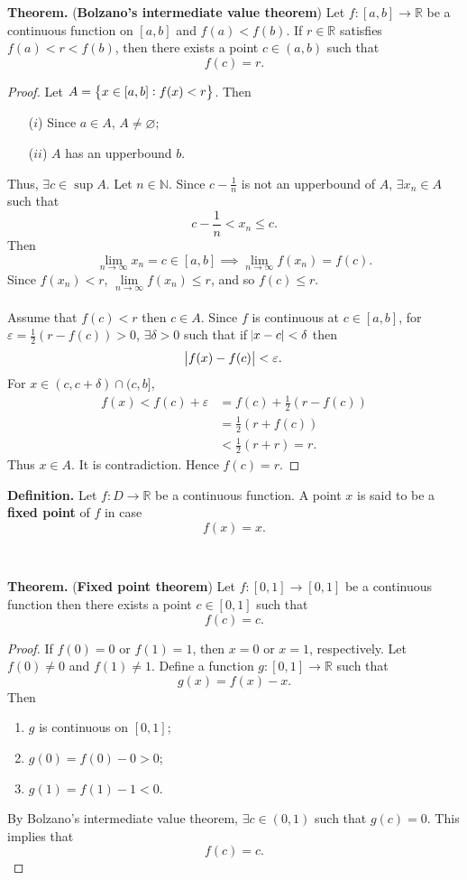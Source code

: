\documentclass[12pt,a4paper]{article}
\newcommand{\dispsty}{\displaystyle}
\begin{document}
\begin{tcolorbox}[colback=white]
	\textbf{Theorem.} (\textbf{Bolzano's intermediate value theorem}) Let $f:[a,b]\to\mathbb{R}$ be a continuous function on $[a,b]$ and $f(a)<f(b)$. If $r\in\mathbb{R}$ satisfies $f(a)<r<f(b)$, then there exists a point $c\in(a,b)$ such that \[
	f(c)=r.
	\]\tcblower\begin{proof}
		Let $A=\set{x\in[a,b]: f(x)<r}$. Then \begin{itemize}
			\item[($i$)] Since $a\in A$, $A\neq\varnothing$;
			\item[($ii$)] $A$ has an upperbound $b$.
		\end{itemize} Thus, $\exists c\in\sup A$. Let $n\in\mathbb{N}$. Since $c-\dispsty\frac{1}{n}$ is not an upperbound of $A$, $\exists x_n\in A$ such that \[
	c-\frac{1}{n}<x_n\leq c.
	\] Then \[
		\lim\limits_{n\to\infty}x_n=c\in[a,b]\implies\lim\limits_{n\to\infty}f(x_n)=f(c).
	\] Since $f(x_n)<r$, $\lim\limits_{n\to\infty}f(x_n)\leq r$, and so $f(c)\leq r$.\\
	\\
	Assume that $f(c)<r$ then $c\in A$. Since $f$ is continuous at $c\in[a,b]$, for $\varepsilon=\dispsty\frac{1}{2}(r-f(c))>0$, $\exists\delta>0$ such that if $\abs{x-c}<\delta$ then \[
	\abs{f(x)-f(c)}<\varepsilon.
	\] For $x\in(c,c+\delta)\cap(c,b]$, \begin{align*}
	f(x)<f(c)+\varepsilon &=f(c)+\frac{1}{2}(r-f(c))\\
	&=\frac{1}{2}(r+f(c)) \\
	&<\frac{1}{2}(r+r)=r.
	\end{align*} Thus $x\in A$. It is contradiction. Hence $f(c)=r$.
	\end{proof}
\end{tcolorbox}
\newpage
\begin{tcolorbox}[colback=white]
	\textbf{Definition.} Let $f:D\to\mathbb{R}$ be a continuous function. A point $x$ is said to be a \textbf{fixed point} of $f$ in case \[
	f(x)=x.
	\]
\end{tcolorbox}
\
\begin{tcolorbox}[colback=white]
	\textbf{Theorem.} (\textbf{Fixed point theorem}) Let $f:[0,1]\to[0,1]$ be a continuous function then there exists a point $c\in[0,1]$ such that \[
	f(c)=c.
	\]\tcblower\begin{proof}
		If $f(0)=0$ or $f(1)=1$, then $x=0$ or $x=1$, respectively. Let $f(0)\neq0$ and $f(1)\neq 1$. Define a function $g:[0,1]\to\mathbb{R}$ such that \[
		g(x)=f(x)-x.
		\] Then \begin{enumerate}
			\item $g$ is continuous on $[0,1]$;
			\item $g(0)=f(0)-0>0$;
			\item $g(1)=f(1)-1<0$.
		\end{enumerate} By Bolzano's intermediate value theorem, $\exists c\in(0,1)$ such that $g(c)=0$. This implies that \[
	f(c)=c.
	\]
	\end{proof}
\end{tcolorbox}
\end{document}
